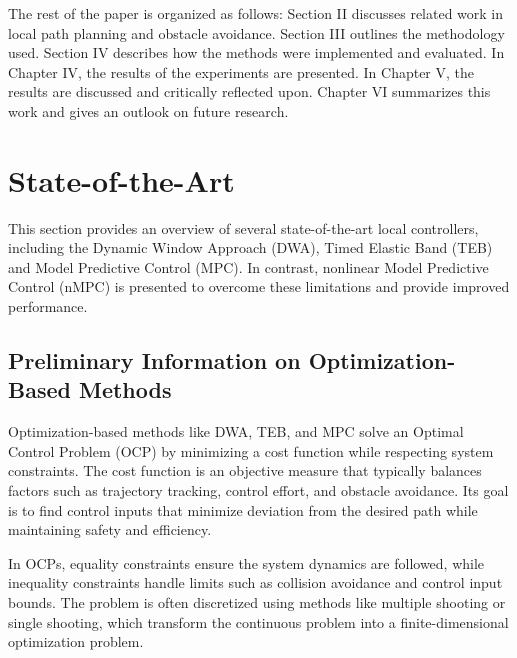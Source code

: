 \documentclass[conference]{IEEEtran}
\begin{document}

The rest of the paper is organized as follows: Section II discusses related work in local path planning and obstacle avoidance. Section III outlines the methodology used. Section IV describes how the methods were implemented and evaluated. In Chapter IV, the results of the experiments are presented. In Chapter V, the results are discussed and critically reflected upon. Chapter VI summarizes this work and gives an outlook on future research.

\section{State-of-the-Art}

This section provides an overview of several state-of-the-art local controllers, including the Dynamic Window Approach (DWA), Timed Elastic Band (TEB) and Model Predictive Control (MPC). In contrast, nonlinear Model Predictive Control (nMPC) is presented to overcome these limitations and provide improved performance.

\subsection{Preliminary Information on Optimization-Based Methods}

Optimization-based methods like DWA, TEB, and MPC solve an Optimal Control Problem (OCP) by minimizing a cost function while respecting system constraints. The cost function is an objective measure that typically balances factors such as trajectory tracking, control effort, and obstacle avoidance. Its goal is to find control inputs that minimize deviation from the desired path while maintaining safety and efficiency.

In OCPs, equality constraints ensure the system dynamics are followed, while inequality constraints handle limits such as collision avoidance and control input bounds. The problem is often discretized using methods like multiple shooting or single shooting, which transform the continuous problem into a finite-dimensional optimization problem.
\end{document}

